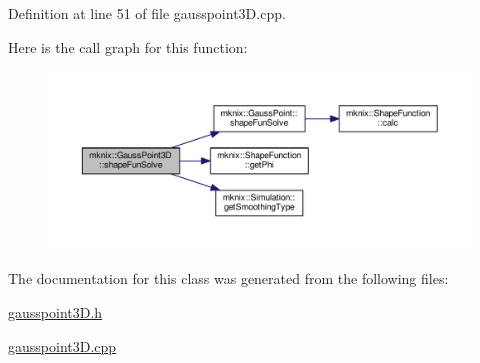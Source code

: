 Definition at line 51 of file gausspoint3\+D.\+cpp.



Here is the call graph for this function\+:\nopagebreak
\begin{figure}[H]
\begin{center}
\leavevmode
\includegraphics[width=350pt]{d6/d47/classmknix_1_1_gauss_point3_d_aef6888ced250ce6d0eee3bd16570579c_cgraph}
\end{center}
\end{figure}




The documentation for this class was generated from the following files\+:\begin{DoxyCompactItemize}
\item 
\hyperlink{gausspoint3_d_8h}{gausspoint3\+D.\+h}\item 
\hyperlink{gausspoint3_d_8cpp}{gausspoint3\+D.\+cpp}\end{DoxyCompactItemize}
